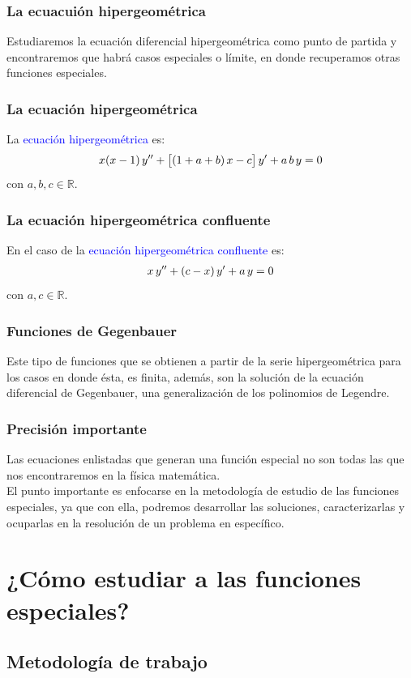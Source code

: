 \documentclass[12pt]{beamer}
\begin{document}
\begin{frame}
\frametitle{La ecuacuión hipergeométrica}
Estudiaremos la ecuación diferencial hipergeométrica como punto de partida y encontraremos que habrá casos especiales o límite, en donde recuperamos otras funciones especiales.
\end{frame}
\begin{frame}
\frametitle{La ecuación hipergeométrica}
La \textcolor{blue}{ecuación hipergeométrica} es:
\begin{align*}
x(x - 1) \, {y}^{\prime \prime} + \big[ (1 + a + b) \, x - c \big] \, {y}^{\prime} +  a \, b \, y = 0
\end{align*}
con $a, b, c \in \mathbb{R}$.
\end{frame}
\begin{frame}
\frametitle{La ecuación hipergeométrica confluente}
En el caso de la \textcolor{blue}{ecuación hipergeométrica confluente} es:
\begin{align*}
x \, {y}^{\prime \prime} + (c - x) \, {y}^{\prime} +  a \, y = 0
\end{align*}
con $a, c \in \mathbb{R}$.
\end{frame}
\begin{frame}
\frametitle{Funciones de Gegenbauer}
Este tipo de funciones que se obtienen a partir de la serie hipergeométrica para los casos en donde ésta, es finita, además, son la solución de la ecuación diferencial de Gegenbauer, una generalización de los polinomios de Legendre.
\end{frame}
\begin{frame}
\frametitle{Precisión importante}
Las ecuaciones enlistadas que generan una función especial no son todas las que nos encontraremos en la física matemática.
\\
\bigskip
\pause
El punto importante es enfocarse en la metodología de estudio de las funciones especiales, ya que con ella, podremos desarrollar las soluciones, caracterizarlas y ocuparlas en la resolución de un problema en específico.
\end{frame}

\section{¿Cómo estudiar a las funciones especiales?}
\subsection{Metodología de trabajo}
\end{document}
